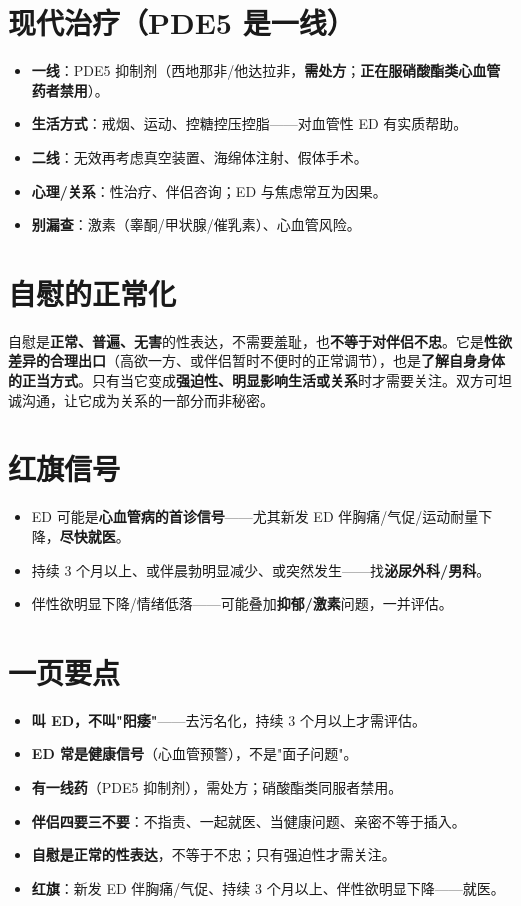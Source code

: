 \documentclass[12pt,UTF8,openany]{ctexbook}
\begin{document}
\section{现代治疗（PDE5 是一线）}
\begin{itemize}[leftmargin=2em,itemsep=0.3em]
  \item \textbf{一线}：PDE5 抑制剂（西地那非/他达拉非，\textbf{需处方}；\textbf{正在服硝酸酯类心血管药者禁用}）。
  \item \textbf{生活方式}：戒烟、运动、控糖控压控脂——对血管性 ED 有实质帮助。
  \item \textbf{二线}：无效再考虑真空装置、海绵体注射、假体手术。
  \item \textbf{心理/关系}：性治疗、伴侣咨询；ED 与焦虑常互为因果。
  \item \textbf{别漏查}：激素（睾酮/甲状腺/催乳素）、心血管风险。
\end{itemize}

\section{自慰的正常化}
自慰是\textbf{正常、普遍、无害}的性表达，不需要羞耻，也\textbf{不等于对伴侣不忠}。它是\textbf{性欲差异的合理出口}（高欲一方、或伴侣暂时不便时的正常调节），也是\textbf{了解自身身体的正当方式}。只有当它变成\textbf{强迫性、明显影响生活或关系}时才需要关注。双方可坦诚沟通，让它成为关系的一部分而非秘密。

\section{红旗信号}
\begin{itemize}[leftmargin=2em,itemsep=0.3em]
  \item ED 可能是\textbf{心血管病的首诊信号}——尤其新发 ED 伴胸痛/气促/运动耐量下降，\textbf{尽快就医}。
  \item 持续 3 个月以上、或伴晨勃明显减少、或突然发生——找\textbf{泌尿外科/男科}。
  \item 伴性欲明显下降/情绪低落——可能叠加\textbf{抑郁/激素}问题，一并评估。
\end{itemize}

\section{一页要点}
\begin{itemize}[leftmargin=2em,itemsep=0.3em]
  \item \textbf{叫 ED，不叫"阳痿"}——去污名化，持续 3 个月以上才需评估。
  \item \textbf{ED 常是健康信号}（心血管预警），不是"面子问题"。
  \item \textbf{有一线药}（PDE5 抑制剂），需处方；硝酸酯类同服者禁用。
  \item \textbf{伴侣四要三不要}：不指责、一起就医、当健康问题、亲密不等于插入。
  \item \textbf{自慰是正常的性表达}，不等于不忠；只有强迫性才需关注。
  \item \textbf{红旗}：新发 ED 伴胸痛/气促、持续 3 个月以上、伴性欲明显下降——就医。
\end{itemize}
\end{document}
